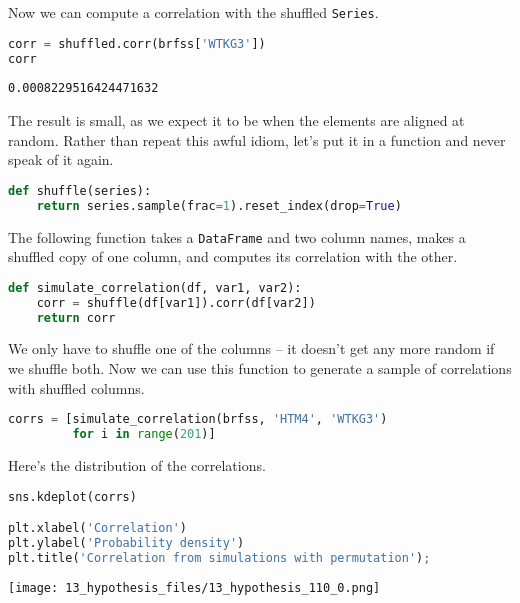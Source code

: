 Now we can compute a correlation with the shuffled
\passthrough{\lstinline!Series!}.

\begin{lstlisting}[language=Python,style=source]
corr = shuffled.corr(brfss['WTKG3'])
corr
\end{lstlisting}

\begin{lstlisting}[style=output]
0.0008229516424471632
\end{lstlisting}

The result is small, as we expect it to be when the elements are aligned
at random. Rather than repeat this awful idiom, let's put it in a
function and never speak of it again.

\begin{lstlisting}[language=Python,style=source]
def shuffle(series):
    return series.sample(frac=1).reset_index(drop=True)
\end{lstlisting}

The following function takes a \passthrough{\lstinline!DataFrame!} and
two column names, makes a shuffled copy of one column, and computes its
correlation with the other.

\begin{lstlisting}[language=Python,style=source]
def simulate_correlation(df, var1, var2):
    corr = shuffle(df[var1]).corr(df[var2])
    return corr
\end{lstlisting}

We only have to shuffle one of the columns -- it doesn't get any more
random if we shuffle both. Now we can use this function to generate a
sample of correlations with shuffled columns.

\begin{lstlisting}[language=Python,style=source]
corrs = [simulate_correlation(brfss, 'HTM4', 'WTKG3')
         for i in range(201)]
\end{lstlisting}

Here's the distribution of the correlations.

\begin{lstlisting}[language=Python,style=source]
sns.kdeplot(corrs)

plt.xlabel('Correlation')
plt.ylabel('Probability density')
plt.title('Correlation from simulations with permutation');
\end{lstlisting}

\begin{center}
\texttt{[image: 13\_hypothesis\_files/13\_hypothesis\_110\_0.png]}
\end{center}

